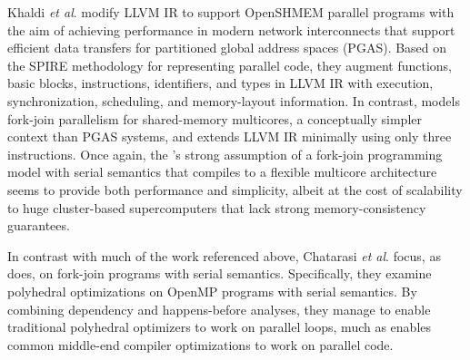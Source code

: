 Khaldi \textit{et al}.\@ \cite{KhaldiJoIr15} modify LLVM IR to support
OpenSHMEM parallel programs with the aim of achieving performance in
modern network interconnects that support efficient data transfers for
partitioned global address spaces (PGAS).  Based on the SPIRE
methodology \cite{KhaldiJoAn12} for representing parallel code, they
augment functions, basic blocks, instructions, identifiers, and types
in LLVM IR with execution, synchronization, scheduling, and
memory-layout information.  In contrast, \tapir models fork-join
parallelism for shared-memory multicores, a conceptually simpler
context than PGAS systems, and extends LLVM IR minimally using only
three instructions.  Once again, the \tapir's strong assumption of a
fork-join programming model with serial semantics that compiles to a
flexible multicore architecture seems to provide both performance and
simplicity, albeit at the cost of scalability to huge cluster-based
supercomputers that lack strong memory-consistency guarantees.



In contrast with much of the work referenced above, Chatarasi
\textit{et al}.\@ \cite{ChatarasiShSa15} focus, as \tapir does, on
fork-join programs with serial semantics.  Specifically, they examine
polyhedral optimizations on OpenMP programs with serial semantics.  By
combining dependency and happens-before analyses, they manage
to enable traditional polyhedral optimizers to work on parallel loops,
much as \tapir enables common middle-end compiler optimizations to
work on parallel code.






